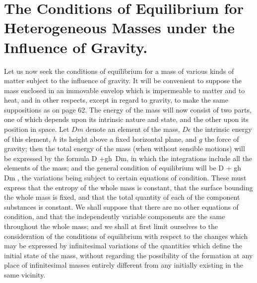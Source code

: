\documentclass[12pt]{memoir}
\begin{document}
\section{The Conditions of Equilibrium for Heterogeneous Masses under the Influence of Gravity.}

Let us now seek the conditions of equilibrium for a mass of various kinds of matter subject to the influence of gravity. It will be convenient to suppose the mass enclosed in an immovable envelop which is impermeable to matter and to heat, and in other respects, except in regard to gravity, to make the same suppositions as on page 62. The energy of the mass will now consist of two parts, one of which depends upon its intrinsic nature and state, and the other upon its position in space. Let $Dm$ denote an element of the mass, $D\epsilon$ the intrinsic energy of this element, $h$ its height above a fixed horizontal plane, and $g$ the force of gravity; then the total energy of the mass (when without sensible motions) will be expressed by the formula
\eqs \int D \epsilon +\int gh \,Dm,    \label{219}\eqe
in which the integrations include all the elements of the mass; and the general condition of equilibrium will be
\eqs  \delta \int D \epsilon + \delta \int gh \, Dm ,  \label{220}\eqe
the variations being subject to certain equations of condition. These must express that the entropy of the whole mass is constant, that the surface bounding the whole mass is fixed, and that the total quantity of each of the component substances is constant. We shall suppose that there are no other equations of condition, and that the independently variable components are the same throughout the whole mass; and we shall at first limit ourselves to the consideration of the conditions of equilibrium with respect to the changes which may be expressed by infinitesimal variations of the quantities which define the initial state of the mass, without regarding the possibility of the formation at any place of infinitesimal masses entirely different from any initially existing in the same vicinity.
\end{document}
